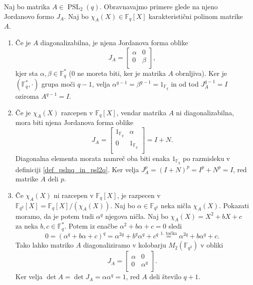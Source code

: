     \begin{dokaz}
    Naj bo matrika $A \in \operatorname{PSL}_2(q)$. Obravnavajmo primere glede na njeno Jordanovo formo $J_A$. Naj bo $\chi_A(X) \in \mathbb{F}_q[X]$ karakteristični polinom matrike $A$. 
    \begin{enumerate}
        \item Če je $A$ diagonalizabilna, je njena Jordanova forma oblike \begin{equation*}
        J_A = \begin{bmatrix}
            \alpha & 0 \\
            0 & \beta \\
        \end{bmatrix},
        \end{equation*}  
          kjer sta $\alpha, \beta \in  \mathbb{F}_q^{*}$ (0 ne moreta biti, ker je matrika $A$ obrnljiva). Ker je $(\mathbb{F}_q^{*}, \cdot)$ grupa moči $q-1$, velja $\alpha^{q-1} = \beta^{q -1} = 1_{\mathbb{F}_q}$ in od tod $J_A^{q-1} = I$ oziroma $A^{q-1} = I$.
          \item Če je $\chi_A(X)$ razcepen v $\mathbb{F}_q[X]$, vendar matrika $A$ ni diagonalizabilna, mora biti njena Jordanova forma oblike \begin{equation*}
          J_A =  \begin{bmatrix}
            1_{\mathbb{F}_q} & \alpha\\
            0 & 1_{\mathbb{F}_q}\\
          \end{bmatrix} = I + N.
          \end{equation*}  
        Diagonalna elementa morata namreč oba biti enaka $1_{\mathbb{F}_q}$ po razmisleku v definiciji \ref{def_pslnq_in_psl2q}. Ker velja $J_A^{p} = (I + N)^{p} = I^{p} + N^{p} = I$, red matrike $A$ deli $p$.  
    \item Če $\chi_A(X)$ ni razcepen v $\mathbb{F}_q[X]$, je razpecen v  $\mathbb{F}_{q^2}[X] = \mathbb{F}_q[X] / (\chi_A(X))$. Naj bo $\alpha \in \mathbb{F}_{q^2}$ neka ničla $\chi_A(X)$. Pokazati moramo, da je potem tudi $\alpha^q$ njegova ničla.
    Naj bo $\chi_A(X) = X^2 + bX + c$ za neka $b ,c \in \mathbb{F}_q^{*}$. Potem iz enačbe $\alpha^2 + b \alpha + c  = 0$ sledi \begin{equation*}
    0 = (\alpha^{q} + b \alpha + c)^q =  \alpha^{2q} + b^{q} \alpha^{q} + c^{q} \stackrel{\text{1.~točka}}{=} \alpha^{2q} + b \alpha^{q} + c.    
    \end{equation*}  
    Tako lahko matriko $A$ diagonaliziramo v kolobarju $M_2(\mathbb{F}_{q^2})$ v obliki \begin{equation*}
    J_A = \begin{bmatrix}
        \alpha & 0\\
        0 & \alpha^{q}\\
    \end{bmatrix}.
    \end{equation*}  
    Ker velja $\det A = \det J_A  = \alpha \alpha^{q} = 1$, red $A$ deli število $q + 1$.
    \end{enumerate}   
\end{dokaz}
